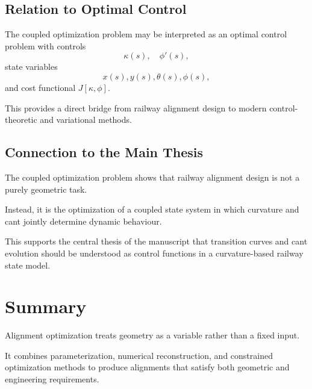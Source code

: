 \subsection{Relation to Optimal Control}

The coupled optimization problem may be interpreted as an optimal
control problem with controls
\[
\kappa(s), \quad \phi'(s),
\]
state variables
\[
x(s),y(s),\theta(s),\phi(s),
\]
and cost functional \(J[\kappa,\phi]\).

This provides a direct bridge from railway alignment design to modern
control-theoretic and variational methods.

\subsection{Connection to the Main Thesis}

\begin{summary}
The coupled optimization problem shows that railway alignment design is
not a purely geometric task.

Instead, it is the optimization of a coupled state system in which
curvature and cant jointly determine dynamic behaviour.

This supports the central thesis of the manuscript that transition
curves and cant evolution should be understood as control functions in a
curvature-based railway state model.
\end{summary}

\section{Summary}

\begin{summary}
Alignment optimization treats geometry as a variable rather than a fixed
input.

It combines parameterization, numerical reconstruction, and constrained
optimization methods to produce alignments that satisfy both geometric
and engineering requirements.
\end{summary}

